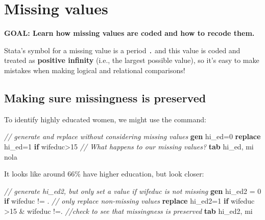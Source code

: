 \documentclass[
]{book}
\newenvironment{Shaded}{\begin{snugshade}}{\end{snugshade}}
\newcommand{\CommentTok}[1]{\textcolor[rgb]{0.56,0.35,0.01}{\textit{#1}}}
\newcommand{\FunctionTok}[1]{\textcolor[rgb]{0.00,0.00,0.00}{#1}}
\newcommand{\KeywordTok}[1]{\textcolor[rgb]{0.13,0.29,0.53}{\textbf{#1}}}
\newcommand{\NormalTok}[1]{#1}
\begin{document}
\hypertarget{missing-values}{%
\section{Missing values}\label{missing-values}}

\begin{alert}

\textbf{GOAL: Learn how missing values are coded and how to recode them.}

\end{alert}

Stata's symbol for a missing value is a period \texttt{.} and this value is coded and treated as \textbf{positive infinity} (i.e., the largest possible value), so it's easy to make mistakes when making logical and relational comparisons!

\hypertarget{making-sure-missingness-is-preserved}{%
\subsection{Making sure missingness is preserved}\label{making-sure-missingness-is-preserved}}

To identify highly educated women, we might use the command:

\begin{Shaded}
\begin{Highlighting}[]
\CommentTok{// generate and replace without considering missing values}
\KeywordTok{gen}\NormalTok{ hi\_ed=0}
\KeywordTok{replace}\NormalTok{ hi\_ed=1 }\KeywordTok{if}\NormalTok{ wifeduc\textgreater{}15}
\CommentTok{// What happens to our missing values?}
\KeywordTok{tab}\NormalTok{ hi\_ed, }\FunctionTok{mi}\NormalTok{ nola}
\end{Highlighting}
\end{Shaded}

It looks like around 66\% have higher education, but look closer:

\begin{Shaded}
\begin{Highlighting}[]
\CommentTok{// generate hi\_ed2, but only set a value if wifeduc is not missing}
\KeywordTok{gen}\NormalTok{ hi\_ed2 = 0 }\KeywordTok{if}\NormalTok{ wifeduc != . }
\CommentTok{// only replace non{-}missing values}
\KeywordTok{replace}\NormalTok{ hi\_ed2=1 }\KeywordTok{if}\NormalTok{ wifeduc \textgreater{}15 \& wifeduc !=. }
\CommentTok{//check to see that missingness is preserved}
\KeywordTok{tab}\NormalTok{ hi\_ed2, }\FunctionTok{mi}
\end{Highlighting}
\end{Shaded}
\end{document}
